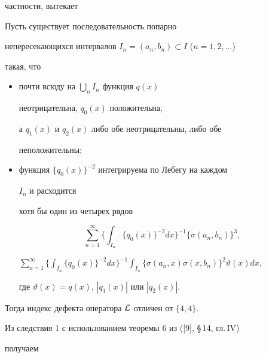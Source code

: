 частности, вытекает 


 


\begin{cor} 


Пусть существует последовательность попарно 


непересекающихся интервалов $I_n=(a_n,b_n)\subset I$ ($n=1,2,\dotsc$) 


такая, что 


\begin{itemize} 


\item[1)] почти всюду на $\bigcup\limits_n I_n$ функция $q(x)$ 


неотрицательна, $q_0(x)$ положительна, 


а $q_1(x)$ и $q_2(x)$ либо обе неотрицательны, либо обе 


неположительны; 


\item[2)] функция $\{q_0(x)\}^{-2}$ интегрируема по Лебегу на каждом 


$I_n$ и расходится 


хотя бы один из четырех рядов 


\begin{equation} 


\sum^\infty_{n=1}\bigg\{\int_{I_n}\{q_0(x)\}^{-2}d x\bigg\}^{-1} 


\{\sigma(a_n,b_n)\}^3,


\end{equation} 


$\displaystyle\sum^\infty_{n=1}\bigg\{\int_{I_n}\{q_0(x)\}^{-2}d x\bigg\}^{-1} 


\int_{I_n}\{\sigma(a_n,x)\sigma(x,b_n)\}^2\vartheta(x)d x$, 


где $\vartheta(x)=q(x)$, $|q_1(x)|$ или $|q_2(x)|$. 


\end{itemize} 


Тогда индекс дефекта оператора $\cal L$ отличен от $\{4,4\}$. 


\end{cor} 


 


Из следствия 1 с использованием теоремы 6 из ([9], \S\,14, гл.\,IV) 


получаем 


 


